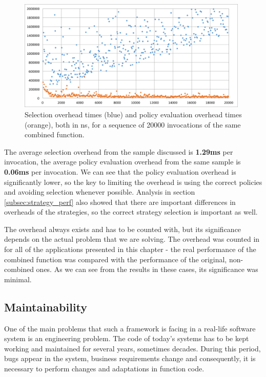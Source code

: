 \begin{figure}[h!]
	\captionsetup{justification=centering,margin=0.5cm}
	\centerline{\mbox{\includegraphics[width=110mm]{./img/overhead_sel_policy.png}}}
	\caption{Selection overhead times (blue) and policy evaluation overhead times (orange), both in ns, for a sequence of 20000 invocations of the same combined function.}
	\label{fig:overhead_sel_policy}
\end{figure}

The average selection overhead from the sample discussed is \textbf{1.29ms} per invocation, the average policy evaluation overhead from the same sample is \textbf{0.06ms} per invocation. We can see that the policy evaluation overhead is significantly lower, so the key to limiting the overhead is using the correct policies and avoiding selection whenever possible. Analysis in section \ref{subsec:strategy_perf} also showed that there are important differences in overheads of the strategies, so the correct strategy selection is important as well.

The overhead always exists and has to be counted with, but its significance depends on the actual problem that we are solving. The overhead was counted in for all of the applications presented in this chapter - the real performance of the combined function was compared with the performance of the original, non-combined ones. As we can see from the results in these cases, its significance was minimal.

\subsection{Maintainability}

One of the main problems that such a framework is facing in a real-life software system is an engineering problem. The code of today's systems has to be kept working and maintained for several years, sometimes decades. During this period, bugs appear in the system, business requirements change and consequently, it is necessary to perform changes and adaptations in function code.

